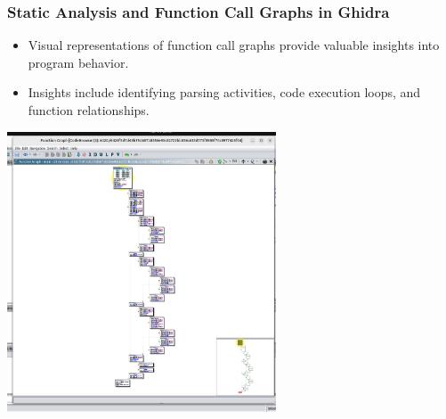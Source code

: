 \begin{frame}
\frametitle{Static Analysis and Function Call Graphs in Ghidra}

\begin{itemize}
    \item Visual representations of function call graphs provide valuable insights into program behavior.
    \item Insights include identifying parsing activities, code execution loops, and function relationships.
\end{itemize}

\centering
\includegraphics[width=0.6\textwidth]{img/gfctg.png}
\end{frame}
